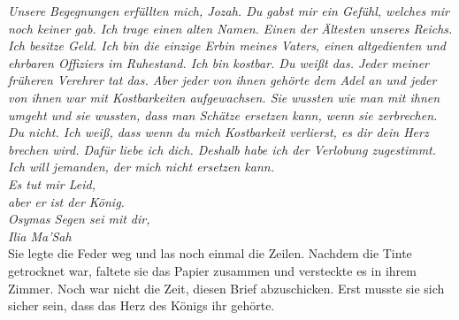 \textit{Unsere Begegnungen erfüllten mich, Jozah. Du gabst mir ein Gefühl, welches mir noch keiner 
gab. Ich trage einen alten Namen. Einen der Ältesten unseres Reichs. Ich besitze Geld. Ich bin die 
einzige Erbin meines Vaters, einen altgedienten und ehrbaren Offiziers im Ruhestand. Ich bin 
kostbar. Du weißt das. Jeder meiner früheren Verehrer tat das. Aber jeder von ihnen gehörte dem 
Adel an und jeder von ihnen war mit Kostbarkeiten aufgewachsen. Sie wussten wie man mit ihnen umgeht 
und sie wussten, dass man Schätze ersetzen kann, wenn sie zerbrechen. Du nicht. Ich weiß, dass wenn 
du mich Kostbarkeit verlierst, es dir dein Herz brechen wird. Dafür liebe ich dich. Deshalb habe 
ich der Verlobung zugestimmt. Ich will jemanden, der mich nicht ersetzen kann.\\}
\textit{Es tut mir Leid,}\\
\textit{aber er ist der König.}\\

\textit{Osymas Segen sei mit dir,}\\
\textit{Ilia Ma'Sah}\\

Sie legte die Feder weg und las noch einmal die Zeilen. Nachdem die Tinte getrocknet war, faltete 
sie das Papier zusammen und versteckte es in ihrem Zimmer. Noch war nicht die Zeit, diesen Brief 
abzuschicken. Erst musste sie sich sicher sein, dass das Herz des Königs ihr gehörte.
